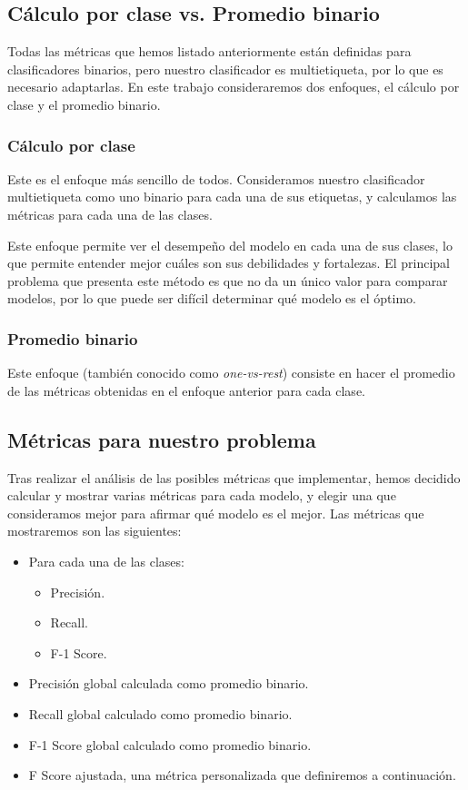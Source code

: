 \subsection{Cálculo por clase vs. Promedio binario}
Todas las métricas que hemos listado anteriormente están definidas para clasificadores binarios, pero nuestro clasificador es multietiqueta, por lo que es necesario adaptarlas. En este trabajo consideraremos dos enfoques, el cálculo por clase y el promedio binario.

\subsubsection{Cálculo por clase}
Este es el enfoque más sencillo de todos. Consideramos nuestro clasificador multietiqueta como uno binario para cada una de sus etiquetas, y calculamos las métricas para cada una de las clases.

Este enfoque permite ver el desempeño del modelo en cada una de sus clases, lo que permite entender mejor cuáles son sus debilidades y fortalezas. El principal problema que presenta este método es que no da un único valor para comparar modelos, por lo que puede ser difícil determinar qué modelo es el óptimo.

\subsubsection{Promedio binario}
Este enfoque (también conocido como \emph{one-vs-rest}) consiste en hacer el promedio de las métricas obtenidas en el enfoque anterior para cada clase.

\subsection{Métricas para nuestro problema}
Tras realizar el análisis de las posibles métricas que implementar, hemos decidido calcular y mostrar varias métricas para cada modelo, y elegir una que consideramos mejor para afirmar qué modelo es el mejor. Las métricas que mostraremos son las siguientes:

\begin{itemize}
	\item Para cada una de las clases:
	\begin{itemize}
		\item Precisión.
		\item Recall.
		\item F-1 Score.
	\end{itemize}
	\item Precisión global calculada como promedio binario.
	\item Recall global calculado como promedio binario.
	\item F-1 Score global calculado como promedio binario.
	\item F Score ajustada, una métrica personalizada que definiremos a continuación.
\end{itemize}

